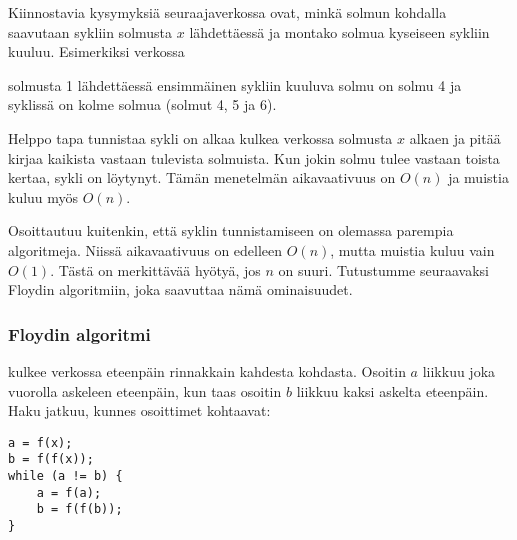 
Kiinnostavia kysymyksiä seuraajaverkossa ovat,
minkä solmun kohdalla saavutaan sykliin
solmusta $x$ lähdettäessä
ja montako solmua kyseiseen sykliin kuuluu.
Esimerkiksi verkossa

\begin{center}
\end{center}
solmusta 1 lähdettäessä ensimmäinen sykliin kuuluva
solmu on solmu 4 ja syklissä on kolme solmua
(solmut 4, 5 ja 6).

Helppo tapa tunnistaa sykli on alkaa kulkea verkossa
solmusta $x$ alkaen ja pitää kirjaa kaikista vastaan tulevista
solmuista. Kun jokin solmu tulee vastaan toista kertaa,
sykli on löytynyt. Tämän menetelmän aikavaativuus on $O(n)$
ja muistia kuluu myös $O(n)$.

Osoittautuu kuitenkin, että syklin tunnistamiseen on
olemassa parempia algoritmeja.
Niissä aikavaativuus on edelleen $O(n)$,
mutta muistia kuluu vain $O(1)$.
Tästä on merkittävää hyötyä, jos $n$ on suuri.
Tutustumme seuraavaksi Floydin algoritmiin,
joka saavuttaa nämä ominaisuudet.

\subsubsection{Floydin algoritmi}


 kulkee verkossa eteenpäin rinnakkain
kahdesta kohdasta.
Osoitin $a$ liikkuu joka vuorolla askeleen eteenpäin,
kun taas osoitin $b$ liikkuu kaksi askelta eteenpäin.
Haku jatkuu, kunnes osoittimet kohtaavat:

\begin{lstlisting}
a = f(x);
b = f(f(x));
while (a != b) {
    a = f(a);
    b = f(f(b));
}
\end{lstlisting}

